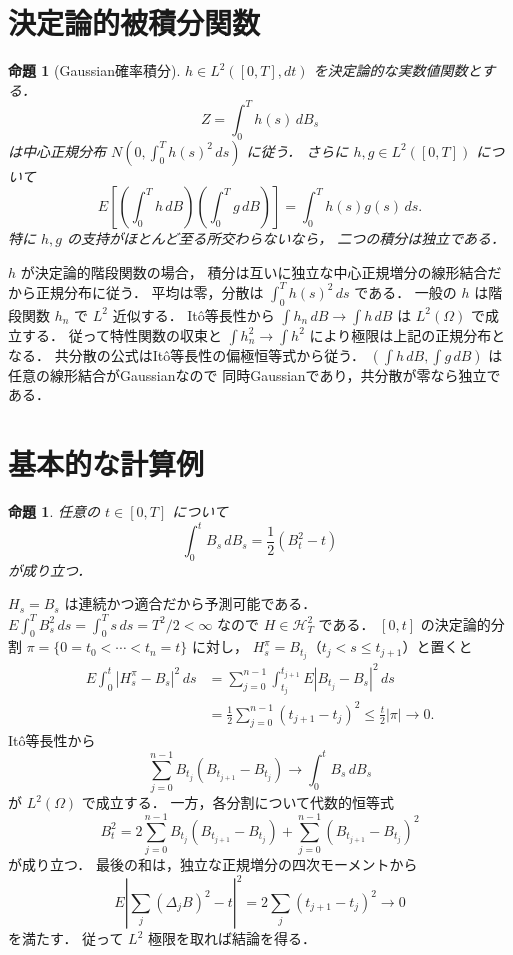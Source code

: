 \documentclass[a5paper,10pt,onecolumn]{jsarticle}
\makeatletter
\theoremstyle{mathnotetheorem}
\newtheorem{proposition}[theorem]{命題}
\renewcommand{\proofname}{証明}
\renewenvironment{proof}[1][\proofname]{%
  \par\pushQED{\qed}\normalfont\topsep4\p@\@plus2\p@\relax
  \trivlist\item[\hskip\labelsep\bfseries #1]\ignorespaces
}{\popQED\endtrivlist\@endpefalse}
\makeatother
\begin{document}
\section{決定論的被積分関数}

\begin{proposition}[Gaussian確率積分]\label{prop:gaussian-int}
$h\in L^2([0,T],dt)$ を決定論的な実数値関数とする．
\[
 Z=\int_0^T h(s)\,dB_s
\]
は中心正規分布 $N(0,\int_0^Th(s)^2\,ds)$ に従う．
さらに $h,g\in L^2([0,T])$ について
\[
 E\left[\left(\int_0^Th\,dB\right)
          \left(\int_0^Tg\,dB\right)\right]
 =\int_0^Th(s)g(s)\,ds.
\]
特に $h,g$ の支持がほとんど至る所交わらないなら，
二つの積分は独立である．
\end{proposition}
\begin{proof}
$h$ が決定論的階段関数の場合，
積分は互いに独立な中心正規増分の線形結合だから正規分布に従う．
平均は零，分散は
$\int_0^Th(s)^2\,ds$ である．
一般の $h$ は階段関数 $h_n$ で $L^2$ 近似する．
It\^o等長性から
$\int h_n\,dB\to\int h\,dB$ は $L^2(\Omega)$ で成立する．
従って特性関数の収束と
$\int h_n^2\to\int h^2$ により極限は上記の正規分布となる．
共分散の公式はIt\^o等長性の偏極恒等式から従う．
$(\int h\,dB,\int g\,dB)$ は任意の線形結合がGaussianなので
同時Gaussianであり，共分散が零なら独立である．
\end{proof}

\section{基本的な計算例}

\begin{proposition}\label{prop:bb}
任意の $t\in[0,T]$ について
\[
 \int_0^tB_s\,dB_s=\frac12(B_t^2-t)
\]
が成り立つ．
\end{proposition}
\begin{proof}
$H_s=B_s$ は連続かつ適合だから予測可能である．
$E\int_0^T B_s^2\,ds=\int_0^Ts\,ds=T^2/2<\infty$
なので $H\in\mathcal H^2_T$ である．
$[0,t]$ の決定論的分割
$\pi=\{0=t_0<\cdots<t_n=t\}$ に対し，
$H^\pi_s=B_{t_j}$（$t_j<s\le t_{j+1}$）と置くと
\begin{align*}
 E\int_0^t|H^\pi_s-B_s|^2\,ds
 &=\sum_{j=0}^{n-1}\int_{t_j}^{t_{j+1}}
   E|B_{t_j}-B_s|^2\,ds\\
 &=\frac12\sum_{j=0}^{n-1}(t_{j+1}-t_j)^2
 \le\frac t2|\pi|\to0.
\end{align*}
It\^o等長性から
\[
 \sum_{j=0}^{n-1}B_{t_j}(B_{t_{j+1}}-B_{t_j})
 \longrightarrow \int_0^tB_s\,dB_s
\]
が $L^2(\Omega)$ で成立する．
一方，各分割について代数的恒等式
\[
 B_t^2
 =2\sum_{j=0}^{n-1}B_{t_j}
     (B_{t_{j+1}}-B_{t_j})
  +\sum_{j=0}^{n-1}(B_{t_{j+1}}-B_{t_j})^2
\]
が成り立つ．
最後の和は，独立な正規増分の四次モーメントから
\[
 E\left|\sum_j(\Delta_jB)^2-t\right|^2
 =2\sum_j(t_{j+1}-t_j)^2\longrightarrow0
\]
を満たす．
従って $L^2$ 極限を取れば結論を得る．
\end{proof}
\end{document}
